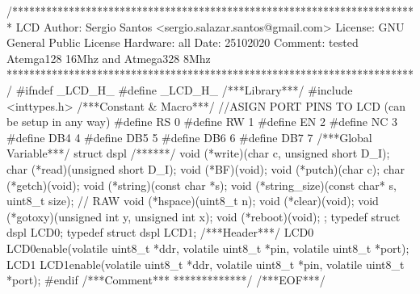 \begin{verbatimtab}
/************************************************************************
LCD
Author: Sergio Santos 
<sergio.salazar.santos@gmail.com>
License: GNU General Public License
Hardware: all
Date: 25102020
Comment:
tested Atemga128 16Mhz and Atmega328 8Mhz
************************************************************************/
#ifndef _LCD_H_
#define _LCD_H_
/***Library***/
#include <inttypes.h>
/***Constant & Macro***/
//ASIGN PORT PINS TO LCD (can be setup in any way)
#define RS 0
#define RW 1
#define EN 2
#define NC 3
#define DB4 4
#define DB5 5
#define DB6 6
#define DB7 7
/***Global Variable***/
struct dspl{
	/******/
	void (*write)(char c, unsigned short D_I);
	char (*read)(unsigned short D_I);
	void (*BF)(void);
	void (*putch)(char c);
	char (*getch)(void);
	void (*string)(const char *s);
	void (*string_size)(const char* s, uint8_t size); // RAW
	void (*hspace)(uint8_t n);
	void (*clear)(void);
	void (*gotoxy)(unsigned int y, unsigned int x);
	void (*reboot)(void);
};
typedef struct dspl LCD0;
typedef struct dspl LCD1;
/***Header***/
LCD0 LCD0enable(volatile uint8_t *ddr, volatile uint8_t *pin, volatile uint8_t *port);
LCD1 LCD1enable(volatile uint8_t *ddr, volatile uint8_t *pin, volatile uint8_t *port);
#endif
/***Comment***
*************/
/***EOF***/
\end{verbatimtab}
